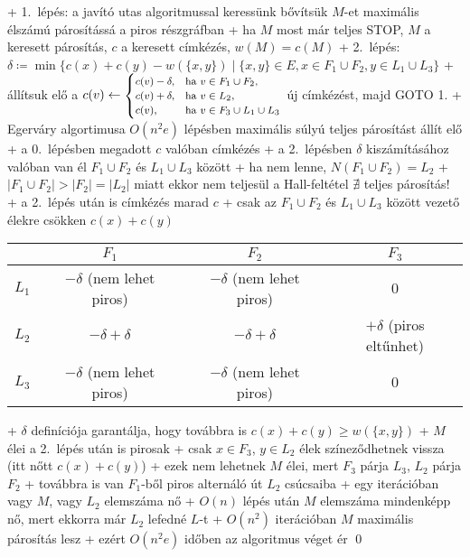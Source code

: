   + 1.~lépés: a javító utas algoritmussal keressünk bővítsük $M$-et
    maximális élszámú párosítássá a piros részgráfban
    + ha $M$ most már teljes \RA STOP, $M$ a keresett párosítás, $c$ a
    keresett címkézés, $w(M) = c(M)$
  + 2.~lépés: $\delta \coloneqq \min \{ c(x) + c(y) - w(\{x, y\}) \mid
    \{x, y\} \in E, x \in F_1 \cup F_2, y \in L_1 \cup L_3 \}$
    + állítsuk elő a $c(v) \gets \text{\footnotesize$\begin{cases}
      c(v) - \delta, & \text{ha $v \in F_1 \cup F_2$,} \\
      c(v) + \delta, & \text{ha $v \in L_2$,} \\
      c(v), & \text{ha $v \in F_3 \cup L_1 \cup L_3$}
    \end{cases}$}$ új címkézést, majd GOTO 1.
+ \thm Egerváry algortimusa $O(n^2 e)$ lépésben maximális súlyú teljes
  párosítást állít elő
  + \proof a 0.~lépésben megadott $c$ valóban címkézés
  + a 2.~lépésben $\delta$ kiszámításához valóban van él $F_1 \cup
  F_2$ és $L_1 \cup L_3$ között
    + ha nem lenne, $N(F_1 \cup F_2) = L_2$
    + $\lvert F_1 \cup F_2 \rvert > \lvert F_2 \rvert = \lvert L_2
    \rvert$ miatt ekkor nem teljesül a Hall-feltétel \RA $\nexists$
    teljes párosítás!
  + a 2.~lépés után is címkézés marad $c$
    + csak az $F_1 \cup F_2$ és $L_1 \cup L_3$ között vezető élekre
    csökken $c(x) + c(y)$
    \par
    {\centering
      \begin{tabular}{c|c|c|c}
        & $F_1$ & $F_2$ & $F_3$ \\\hline
        $L_1$ & $-\delta$ (nem lehet piros) & $-\delta$ (nem lehet piros) & $0$ \\\hline
        $L_2$ & $-\delta + \delta$ & $-\delta + \delta$ & $+\delta$
                                                          (piros eltűnhet) \\\hline
        $L_3$ & $-\delta$ (nem lehet piros) & $-\delta$ (nem lehet piros) & $0$
      \end{tabular}\par}
    + $\delta$ definíciója garantálja, hogy továbbra is $c(x) + c(y)
      \ge w(\{x, y\})$
  + $M$ élei a 2.~lépés után is pirosak
    + csak $x \in F_3$, $y \in L_2$ élek színeződhetnek vissza (itt nőtt
      $c(x) + c(y)$)
    + ezek nem lehetnek $M$ élei, mert $F_3$ párja $L_3$, $L_2$ párja
    $F_2$
    + továbbra is van $F_1$-ből piros alternáló út $L_2$ csúcsaiba
  + egy iterációban vagy $M$, vagy $L_2$ elemszáma nő
   + $O(n)$ lépés után $M$ elemszáma mindenképp nő, mert ekkorra már $L_2$
     lefedné $L$-t
   + $O(n^2)$ iterációban $M$ maximális párosítás lesz
   + ezért $O(n^2 e)$ időben az algoritmus véget ér \qed


